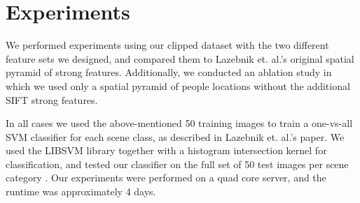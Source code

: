 \documentclass[11pt]{article}
\begin{document}



\section{Experiments}
We performed experiments using our clipped dataset with the two different feature sets we designed, and compared them to Lazebnik et. al.'s original spatial pyramid of strong features. Additionally, we conducted an ablation study in which we used only a spatial pyramid of people locations without the additional SIFT strong features.

In all cases we used the above-mentioned 50 training images to train a one-vs-all SVM classifier for each scene class, as described in Lazebnik et. al.'s paper. We used the LIBSVM library together with a histogram intersection kernel for classification, and tested our classifier on the full set of 50 test images per scene category \cite{libsvm}. Our experiments were performed on a quad core server, and the runtime was approximately 4 days.
\end{document}
